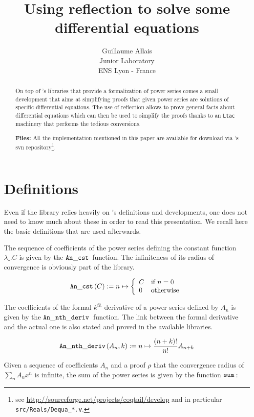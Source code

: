 \documentclass{article}
\title{Using reflection to solve some differential equations}
\author{Guillaume Allais\\
Junior Laboratory \coqtail{}\\
ENS Lyon - France}
\begin{document}
\maketitle{}

\begin{abstract}
On top of \coqtail{}'s libraries that provide a formalization of power series
comes a small development that aims at simplifying proofs that given power
series are solutions of specific differential equations. The use of reflection
allows to prove general facts about differential equations which can then be
used to simplify the proofs thanks to an \texttt{Ltac} machinery that performs
the tedious conversions.

\textbf{Files:} All the implementation mentioned in this paper are
available for download via \coqtail{}'s svn repository\footnote{see
\url{http://sourceforge.net/projects/coqtail/develop}
and in particular \texttt{src/Reals/Dequa\_*.v}.}.
\end{abstract}

\section{Definitions}

Even if the \dequa{} library relies heavily on \coqtail{}'s \Rpser{}
definitions and developments, one does not need to know much about these in
order to read this presentation. We recall here the basic definitions that
are used afterwards.

The sequence of coefficients of the power series defining the constant function
$\lambda\_. C$ is given by the $\operatorname{\mathtt{An\_cst}}{}$ function. The infiniteness of its radius
of convergence is obviously part of the library.

$$\operatorname{\mathtt{An\_cst}}{}(C) := n \mapsto \left\lbrace
\begin{array}{ll}
C & \text{if } n = 0\\
0 & \text{otherwise}
\end{array}
\right.$$

The coefficients of the formal $k^{th}$ derivative of a power series defined by
$A_n$ is given by the $\operatorname{\mathtt{An\_nth\_deriv}}{}$ function. The link between the formal derivative
and the actual one is also stated and proved in the available libraries.

$$\operatorname{\mathtt{An\_nth\_deriv}}{}(A_n, k) := n \mapsto \frac{(n + k)!}{n!}A_{n+k}$$

Given a sequence of coefficients $A_n$ and a proof $\rho$ that the convergence
radius of $\sum_n A_n x^n$ is infinite, the sum of the power series is given by
the function $\operatorname{\mathtt{sum}}{}$:
\end{document}
